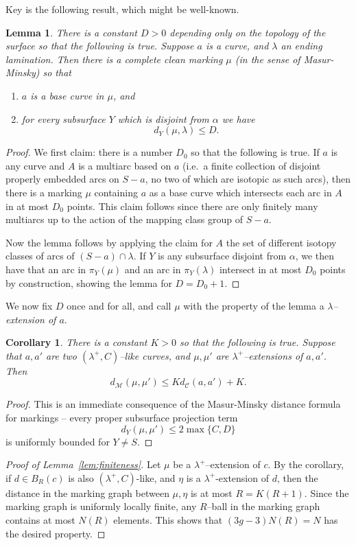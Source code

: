 \documentclass{amsart}
\newtheorem{lemma}[thm]{Lemma}
\newtheorem{cor}[thm]{Corollary}
\theoremstyle{definition}
\begin{document}
Key is the following result, which might be well-known.
\begin{lemma}
  There is a constant $D>0$ depending only on the topology of the
  surface so that the following is true.  Suppose $a$ is a curve,
  and $\lambda$ an ending lamination. Then there is a complete clean
  marking $\mu$ (in the sense of Masur-Minsky) so that
  \begin{enumerate}
  \item $a$ is a base curve in $\mu$, and
  \item for every subsurface $Y$ which is disjoint from $\alpha$ we have
    \[ d_Y(\mu, \lambda) \leq D. \]
  \end{enumerate}
\end{lemma}
\begin{proof}
  We first claim: there is a number $D_0$ so that the following is
  true.  If $a$ is any curve and $A$ is a multiarc based on
  $a$ (i.e.\ a finite collection of disjoint properly embedded
  arcs on $S-a$, no two of which are isotopic as such arcs), then
  there is a marking $\mu$ containing $a$ as a base curve which
  intersects each arc in $A$ in at most $D_0$ points. This claim
  follows since there are only finitely many multiarcs up to the
  action of the mapping class group of $S-a$.

  Now the lemma follows by applying the claim for $A$ the set
  of different isotopy classes of arcs of $(S-a)\cap \lambda$. If
  $Y$ is any subsurface disjoint from $\alpha$, we then have that an arc in
  $\pi_Y(\mu)$ and an arc in $\pi_Y(\lambda)$ intersect in at most
  $D_0$ points by construction, showing the lemma for $D = D_0 + 1$.
\end{proof}
We now fix $D$ once and for all, and call $\mu$ with the property of
the lemma a \emph{$\lambda$--extension of $a$}.
\begin{cor}
  There is a constant $K>0$ so that the following is true.  Suppose
  that $a, a'$ are two $(\lambda^+,C)$--like curves, and
  $\mu, \mu'$ are $\lambda^+$--extensions of $a, a'$. Then
  \[ d_{\mathcal{M}}(\mu, \mu') \leq Kd_{\mathcal{C}}(a,a') + K. \]
\end{cor}
\begin{proof}
  This is an immediate consequence of the Masur-Minsky distance
  formula for markings -- every proper subsurface projection term
  \[ d_Y(\mu, \mu') \leq 2\max\{ C, D \} \]
  is uniformly bounded for $Y \neq S$.
\end{proof}

\begin{proof}[Proof of Lemma~\ref{lem:finiteness}]
  Let $\mu$ be a $\lambda^+$--extension of $c$. By the corollary, if
  $d \in B_{R}(c)$ is also $(\lambda^+,C)$-like, and $\eta$ is a
  $\lambda^+$-extension of $d$, then the distance in the marking graph
  between $\mu, \eta$ is at most $R=K(R+1)$. Since the marking
  graph is uniformly locally finite, any $R$--ball in the marking
  graph contains at most $N(R)$ elements. This shows that
  $(3g-3)N(R) = N$ has the desired property.
\end{proof}
\end{document}

